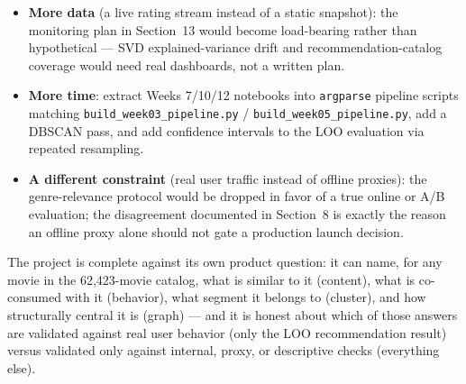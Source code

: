 \documentclass[12pt,a4paper]{article}
\begin{document}
\begin{itemize}[nosep]
  \item \textbf{More data} (a live rating stream instead of a static snapshot): the monitoring plan
    in Section~13 would become load-bearing rather than hypothetical --- SVD explained-variance
    drift and recommendation-catalog coverage would need real dashboards, not a written plan.
  \item \textbf{More time}: extract Weeks 7/10/12 notebooks into \texttt{argparse} pipeline scripts
    matching \texttt{build\_week03\_pipeline.py} / \texttt{build\_week05\_pipeline.py}, add a DBSCAN
    pass, and add confidence intervals to the LOO evaluation via repeated resampling.
  \item \textbf{A different constraint} (real user traffic instead of offline proxies): the
    genre-relevance protocol would be dropped in favor of a true online or A/B evaluation; the
    disagreement documented in Section~8 is exactly the reason an offline proxy alone should not
    gate a production launch decision.
\end{itemize}

The project is complete against its own product question: it can name, for any movie in the
62,423-movie catalog, what is similar to it (content), what is co-consumed with it (behavior), what
segment it belongs to (cluster), and how structurally central it is (graph) --- and it is honest
about which of those answers are validated against real user behavior (only the LOO recommendation
result) versus validated only against internal, proxy, or descriptive checks (everything else).
\end{document}
